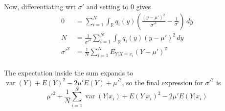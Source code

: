 \documentclass{article}
\DeclareMathOperator{\var}{var}
\newcommand{\rn}{\mathbb{R}}
\begin{document}
Now, differentiating wrt $\sigma'$ and setting to $0$ gives
\begin{align*}
    0&=\sum_{i=1}^N\int_\rn q_i(y)\left(\frac{(y-\mu')^2}{\sigma'^3}-\frac{1}{\sigma'}\right)\,dy\\
    N&=\frac{1}{\sigma'^2}\sum_{i=1}^N\int_\rn q_i(y)(y-\mu')^2\,dy\\
    \sigma'^2&=\frac{1}{N}\sum_{i=1}^NE_{Y|X=x_i}(Y-\mu')^2\\
\end{align*}

The expectation inside the sum expands to $\var(Y)+E(Y)^2-2\mu' E(Y)+\mu'^2$, so the final expression for $\sigma'^2$ is
\[\mu'^2+\frac{1}{N}\sum_{i=1}^N\var(Y|x_i)+E(Y|x_i)^2-2\mu'E(Y|x_i)\]
\end{document}
